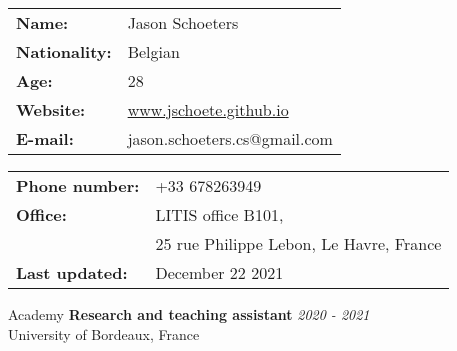 \documentclass[french]{resume} %
\begin{document}
\begin{minipage}[t]{0.49\textwidth}
\begin{tabular}{ m{6em} m{15em} }
\textbf{Name:} & Jason Schoeters\\
\textbf{Nationality:} & Belgian\\
\textbf{Age:} & 28\\
\textbf{Website:} & \url{www.jschoete.github.io}\\
\textbf{E-mail: } & jason.schoeters.cs@gmail.com\\
\end{tabular}
\end{minipage} 
\begin{minipage}[t]{0.49\textwidth}
\begin{tabular}{ m{8em} m{20em} }
\textbf{Phone number: } & +33 678263949\\
\textbf{Office:} & LITIS office B101,\\
&25 rue Philippe Lebon,\newline 76063 Le Havre, France\\
\textbf{Last updated:} & December 22 2021
\end{tabular}
\end{minipage} 

\begin{rSection}{Academy}
	{\bf Research and teaching assistant} \hfill {\em 2020 - 2021} 
	\\ University of Bordeaux, France
\end{rSection}
\end{document}
